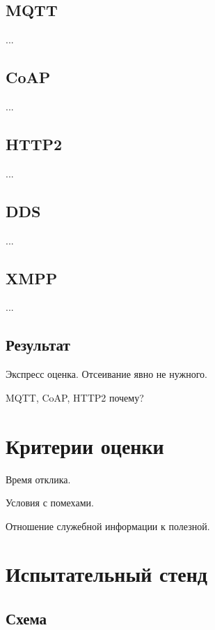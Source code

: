 \documentclass[russian]{article}
\begin{document}
\subsection*{MQTT\cite{MQTT}}

...

\subsection*{CoAP\cite{CoAP}}

...

\subsection*{HTTP2}

...

\subsection*{DDS\cite{DDS}}

...

\subsection*{XMPP\cite{XMPP}}

...

\subsection*{Результат}

Экспресс оценка. Отсеивание явно не нужного.

MQTT, CoAP, HTTP2 почему?

\section*{Критерии оценки}

Время отклика.

Условия с помехами.

Отношение служебной информации к полезной.

\section*{Испытательный стенд}

\subsection*{Схема}
\end{document}

